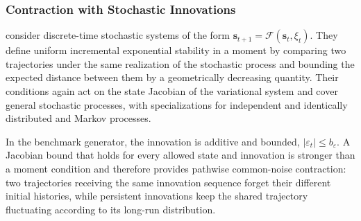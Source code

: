 \subsubsection{Contraction with Stochastic Innovations}

\citet{kawano2024contraction} consider discrete-time stochastic systems of the
form $\mathbf{s}_{t+1}=\mathcal F(\mathbf{s}_t,\xi_t)$. They define uniform
incremental exponential stability in a moment by comparing two trajectories
under the same realization of the stochastic process and bounding the expected
distance between them by a geometrically decreasing quantity. Their conditions
again act on the state Jacobian of the variational system and cover general
stochastic processes, with specializations for independent and identically
distributed and Markov processes.

In the benchmark generator, the innovation is additive and bounded,
$|\varepsilon_t|\le b_{\varepsilon}$. A Jacobian bound that holds for every
allowed state and innovation is stronger than a moment condition and therefore
provides pathwise common-noise contraction: two trajectories receiving the same
innovation sequence forget their different initial histories, while persistent
innovations keep the shared trajectory fluctuating according to its long-run
distribution.
